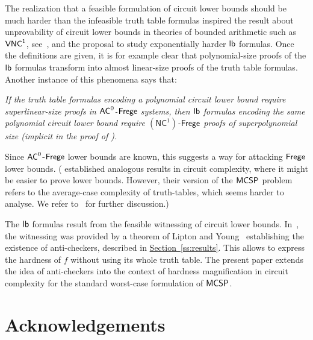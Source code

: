 \documentclass[11pt]{article}
\numberwithin{equation}{section}
\theoremstyle{definition}
\theoremstyle{plain}
\newcommand{\expref}[2]{\hyperref[#2]{#1~\ref{#2}}}
\newcommand{\VNC}{\ensuremath{{\sf VNC}^1}\xspace}
\newcommand{\Frege}{\ensuremath{{\sf Frege}}\xspace}
\newcommand{\AC}{\ensuremath{{\sf AC}^0}\xspace}
\newcommand{\MCSP}{\ensuremath{{\sf MCSP}}\xspace}
\newcommand{\lb}{\ensuremath{{\sf lb}}\xspace}
\begin{document}
The realization that a feasible formulation of circuit lower bounds should be much harder than the infeasible truth table formulas inspired the result about unprovability of circuit lower bounds in theories of bounded arithmetic such as \VNC, see~\cite{Pclba}, and the proposal \cite[0.1 Circuit lower bounds and Complexity-Theoretic tautologies]{Pthesis} to study exponentially harder \lb formulas. 
Once the definitions are given, it is for example clear that polynomial-size proofs of the \lb formulas transform into almost linear-size proofs of the truth table formulas. Another instance of this phenomena says that:

\vspace{0.1cm}

\smallskip
\noindent \emph{If the truth table formulas encoding a polynomial circuit lower bound require superlinear-size proofs in \AC-\Frege systems, then \lb formulas encoding the same polynomial circuit lower bound require $(\mathsf{NC}^1)$-\Frege proofs of superpolynomial size \emph{(implicit in the proof of} \emph{\cite[Proposition 4.14]{DBLP:journals/eccc/MullerP17}}\emph{)}.}
\smallskip


\vspace{0.1cm}



\noindent Since \AC-\Frege lower bounds are known, this suggests a way for attacking \Frege lower bounds. (\cite{OS18} established analogous results in circuit complexity, where it might be easier to prove lower bounds. However, their version of the \MCSP problem refers to the average-case complexity of truth-tables, which seems harder to analyse. We refer to~\cite{OS18} for further discussion.)


The \lb formulas result from the feasible witnessing of circuit lower bounds. In~\cite{DBLP:journals/eccc/MullerP17}, the witnessing was provided by a theorem of Lipton and Young~\cite{DBLP:conf/stoc/LiptonY94} establishing the existence of anti-checkers, described in \expref{Section}{ss:results}. This allows to express the hardness of $f$ without using its whole truth table. The present paper extends the idea of anti-checkers into the context of hardness magnification in circuit complexity for the standard worst-case formulation of \MCSP. 




\section*{Acknowledgements}
\end{document}
